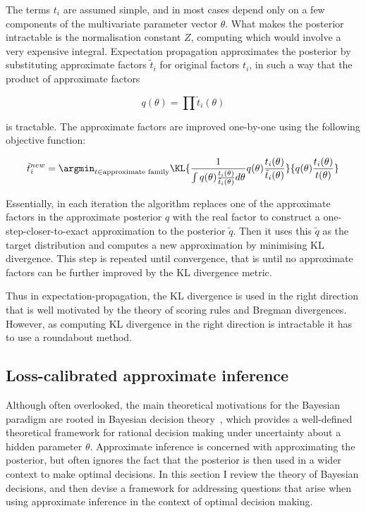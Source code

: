 The terms $t_i$ are assumed simple, and in most cases depend only on a few components of the multivariate parameter vector $\theta$. What makes the posterior intractable is the normalisation constant $Z$, computing which would involve a very expensive integral. Expectation propagation approximates the posterior by substituting approximate factors $\tilde{t}_i$ for original factors $t_i$, in such a way that the product of approximate factors

\begin{equation}
	q(\theta) = \prod \tilde{t}_i(\theta)
\end{equation}

is tractable. The approximate factors are improved one-by-one using the following objective function:

\begin{equation}
	\tilde{t}_i^{new} = \argmin_{t \in \text{approximate family}} \KL{\frac{1}{\int q(\theta)\frac{t_i(\theta)}{\tilde{t}_i(\theta)} d\theta}q(\theta)\frac{t_i(\theta)}{\tilde{t}_i(\theta)}}{q(\theta)\frac{t_i(\theta)}{t(\theta)}}
\end{equation}

Essentially, in each iteration the algorithm replaces one of the approximate factors in the approximate posterior $q$ with the real factor to construct a one-step-closer-to-exact approximation to the posterior $\tilde{q}$. Then it uses this $\tilde{q}$ as the target distribution and computes a new approximation by minimising KL divergence. This step is repeated until convergence, that is until no approximate factors can be further improved by the KL divergence metric.

Thus in expectation-propagation, the KL divergence is used in the right direction that is well motivated by the theory of scoring rules and Bregman divergences. However, as computing KL divergence in the right direction is intractable it has to use a roundabout method.

\subsection{Loss-calibrated approximate inference}

Although often overlooked, the main theoretical motivations for the Bayesian paradigm are rooted in Bayesian decision theory~\cite{berger85decision}, which provides a well-defined theoretical framework for rational decision making under uncertainty about a hidden parameter $\theta$. Approximate inference is concerned with approximating the posterior, but often ignores the fact that the posterior is then used in a wider context to make optimal decisions. In this section I review the theory of Bayesian decisions, and then devise a framework for addressing questions that arise when using approximate inference in the context of optimal decision making.

